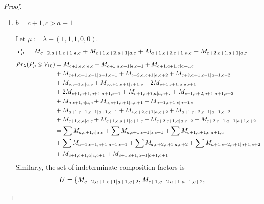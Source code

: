 \begin{proof}
\begin{enumerate}
\begin{enumerate}
        \item $b=c+1,c>a+1$ \par
        Let $\mu:=\lambda + (1,1,1,0,0) $.
        \begin{equation}\notag
          \begin{aligned}
            P_\mu = M_{c+2,a+1,c+1|a,c}
+ M_{c+1,c+2,a+1|a,c}
+ M_{a+1,c+2,c+1|a,c}
+ M_{c+2,c+1,a+1|a,c}
          \end{aligned}
        \end{equation}
        \begin{equation}\notag
          \begin{aligned}
            Pr_{\lambda}(P_\mu \otimes V_{10}) &=
M_{c+1,a,c|a,c}
+ M_{c+1,a,c+1|a,c+1}
+ M_{c+1,a+1,c|a+1,c}\\
                                              &
+ M_{c+1,a+1,c+1|a+1,c+1}
+ M_{c+2,a,c+1|a,c+2}
+ M_{c+2,a+1,c+1|a+1,c+2}\\
                                              &
+ M_{c,c+1,a|a,c}
+ M_{c,c+1,a+1|a+1,c}
+ 2M_{c+1,c+1,a|a,c+1}\\
                                              &
+ 2M_{c+1,c+1,a+1|a+1,c+1}
+ M_{c+1,c+2,a|a,c+2}
+ M_{c+1,c+2,a+1|a+1,c+2}\\
                                              &
+ M_{a,c+1,c|a,c}
+ M_{a,c+1,c+1|a,c+1}
+ M_{a+1,c+1,c|a+1,c}\\
                                              &
+ M_{a+1,c+1,c+1|a+1,c+1}
+ M_{a,c+2,c+1|a,c+2}
+ M_{a+1,c+2,c+1|a+1,c+2}\\
                                              &
+ M_{c+1,c,a|a,c}
+ M_{c+1,c,a+1|a+1,c}
+ M_{c+2,c+1,a|a,c+2}
+ M_{c+2,c+1,a+1|a+1,c+2} \\
                                               &=
\sum M_{a,c+1,c|a,c}
+ \sum M_{a,c+1,c+1|a,c+1}
+ \sum M_{a+1,c+1,c|a+1,c}\\
                                              &
+ \sum M_{a+1,c+1,c+1|a+1,c+1}
+ \sum M_{a,c+2,c+1|a,c+2}
+ \sum M_{a+1,c+2,c+1|a+1,c+2}\\
                                              &
+  M_{c+1,c+1,a|a,c+1}
+  M_{c+1,c+1,a+1|a+1,c+1}
          \end{aligned}
        \end{equation}
      Similarly, the set of indeterminate composition factors is 
\begin{equation}\notag
  \begin{aligned}
    U = \{
M_{c+2,a+1,c+1|a+1,c+2},
M_{c+1,c+2,a+1|a+1,c+2},

\end{aligned}
\end{equation}
\end{enumerate}
\end{enumerate}
\end{proof}
